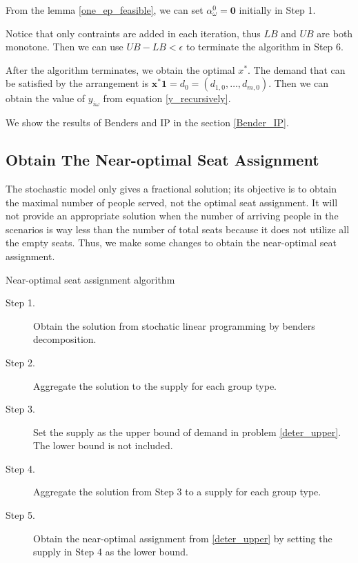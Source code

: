 \begin{remark}
From the lemma \ref{one_ep_feasible}, we can set $\alpha_{\omega}^0 = \mathbf{0}$ initially in Step 1. 
\end{remark}

\begin{remark}
  Notice that only contraints are added in each iteration, thus $LB$ and $UB$ are both monotone. Then we can use $UB - LB < \epsilon$ to terminate the algorithm in Step 6.
\end{remark}


After the algorithm terminates, we obtain the optimal $x^{*}$. The demand that can be satisfied by the arrangement is $\mathbf{x}^{*} \mathbf{1} = d_0 = (d_{1,0},\ldots,d_{m,0})$.
Then we can obtain the value of $y_{i \omega}$ from equation \eqref{y_recursively}.

We show the results of Benders and IP in the section \ref{Bender_IP}.

\subsection{Obtain The Near-optimal Seat Assignment}

The stochastic model only gives a fractional solution; its objective is to obtain the maximal number of people served, not the optimal seat assignment. It will not provide an appropriate solution when the number of arriving people in the scenarios is way less than the number of total seats because it does not utilize all the empty seats.
Thus, we make some changes to obtain the near-optimal seat assignment.




\begin{algorithm}[H]\label{near-optimal}
  \caption{Near-optimal seat assignment algorithm}
    \begin{description}
    \item[Step 1.] Obtain the solution from stochatic linear programming by benders decomposition.

    \item[Step 2.] Aggregate the solution to the supply for each group type.

    \item[Step 3.] Set the supply as the upper bound of demand in problem \eqref{deter_upper}. The lower bound is not included.
    
    \item[Step 4.] Aggregate the solution from Step 3 to a supply for each group type.

    \item[Step 5.] Obtain the near-optimal assignment from \eqref{deter_upper} by setting the supply in Step 4 as the lower bound.
   \end{description}
  \end{algorithm}

